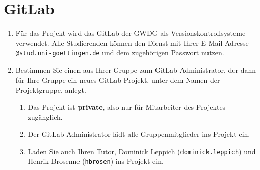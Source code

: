 \section*{GitLab}

\begin{enumerate}
\item 
Für das Projekt wird das GitLab der GWDG  als Versionskontrollsysteme verwendet.
Alle Studierenden können den Dienst mit Ihrer E-Mail-Adresse \texttt{@stud.uni-goettingen.de}
und dem zugehörigen Passwort nutzen. 
\item 
Bestimmen Sie einen aus Ihrer Gruppe zum GitLab-Administrator, 
der dann für Ihre Gruppe ein neues GitLab-Projekt, unter dem Namen der Projektgruppe, anlegt.

\begin{enumerate}[label=\alph*)]
\item Das Projekt ist \textbf{private}, also nur für Mitarbeiter des Projektes zugänglich.
\item Der GitLab-Administrator lädt alle Gruppenmitglieder ins Projekt ein.
\item Laden Sie auch Ihren Tutor, Dominick Leppich (\texttt{dominick.leppich}) und Henrik Brosenne (\texttt{hbrosen}) ins Projekt ein.
\end{enumerate}
\end{enumerate}
